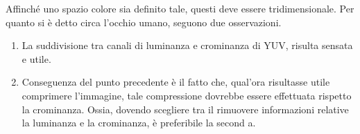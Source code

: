 \documentclass{subfiles}
\begin{document}
Affinché uno spazio colore sia definito tale, questi deve essere tridimensionale.
Per quanto si è detto circa l'occhio umano, seguono due osservazioni.
\begin{enumerate}
    \item La suddivisione tra canali di luminanza e crominanza di YUV, risulta sensata e utile.
    \item Conseguenza del punto precedente è il fatto che, qual'ora risultasse utile comprimere l'immagine,
          tale compressione dovrebbe essere effettuata rispetto la crominanza. Ossia, dovendo scegliere tra il rimuovere informazioni relative la luminanza e la crominanza,
          è preferibile la second   a.
\end{enumerate}
\end{document}
